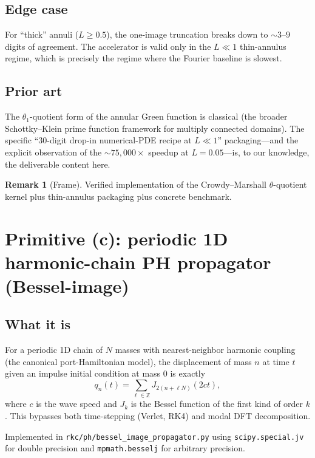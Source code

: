\documentclass[11pt,reqno]{amsart}
\theoremstyle{definition}
\newtheorem{remark}[theorem]{Remark}
\begin{document}
\subsection{Edge case}
For ``thick'' annuli ($L \ge 0.5$), the one-image truncation breaks
down to $\sim 3$--$9$ digits of agreement. The accelerator is valid
only in the $L \ll 1$ thin-annulus regime, which is precisely the
regime where the Fourier baseline is slowest.

\subsection{Prior art}
The $\theta_1$-quotient form of the annular Green function is classical
\cite{CrowdyMarshall2007} (the broader Schottky--Klein prime function
framework for multiply connected domains). The specific
``$30$-digit drop-in numerical-PDE recipe at $L \ll 1$'' packaging---and
the explicit observation of the $\sim 75{,}000\times$ speedup at
$L = 0.05$---is, to our knowledge, the deliverable content here.

\begin{remark}[Frame]
Verified implementation of the Crowdy--Marshall $\theta$-quotient
kernel plus thin-annulus packaging plus concrete benchmark.
\end{remark}

\section{Primitive (c): periodic 1D harmonic-chain PH propagator (Bessel-image)}\label{sec:bessel}

\subsection{What it is}
For a periodic 1D chain of $N$ masses with nearest-neighbor harmonic
coupling (the canonical port-Hamiltonian model), the displacement of
mass $n$ at time $t$ given an impulse initial condition at mass $0$ is
exactly
\begin{equation}\label{eq:bessel-image}
q_n(t) = \sum_{\ell \in \mathbb{Z}} J_{2(n + \ell N)}(2 c t),
\end{equation}
where $c$ is the wave speed and $J_k$ is the Bessel function of the
first kind of order $k$. This bypasses both time-stepping (Verlet,
RK4) and modal DFT decomposition.

Implemented in \verb|rkc/ph/bessel_image_propagator.py| using
\verb|scipy.special.jv| for double precision and \verb|mpmath.besselj|
for arbitrary precision.
\end{document}
